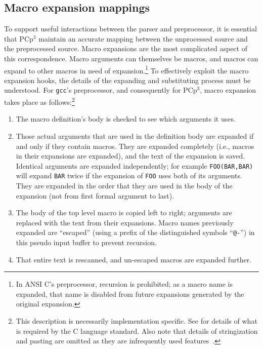 \documentclass{article}
\newcommand{\pcp}{\mbox{\textsf{PCp}$^3$}}
\newcommand{\C}{\mbox{\textsf{C}}}
\newcommand{\ie}{i.e.,}
\begin{document}
\subsection{Macro expansion mappings}
To support useful interactions between the parser and preprocessor, it
is essential that \pcp{} maintain an accurate mapping between the
unprocessed source and the preprocessed source.  Macro expansions are
the most complicated aspect of this correspondence.  Macro arguments can
themselves be macros, and macros can expand to other macros in need of
expansion.\footnote{In ANSI \C{}'s preprocessor, recursion is
  prohibited; as a macro name is expanded, that name is disabled from
  future expansions generated by the original expansion.}  To
effectively exploit the macro expansion hooks, the details of the
expanding and substituting process must be understood.  For
\texttt{gcc}'s preprocessor, and consequently for \pcp{}, macro
expansion takes place as follows:\footnote{This description is necessarily
  implementation specific.  See \cite[Ch.~3]{Harbison91} for details of
  what is required by the \C{} language standard.  Also note that
  details of stringization and pasting are omitted as they are
  infrequently used features~\cite{EmpCpp}.}

\begin{enumerate}
\item The macro definition's body is checked to see which arguments it uses.
\item Those actual arguments that are used in the definition body are
      expanded if and only if they contain macros.  They are expanded
      completely (\ie{} macros in their expansions are expanded), and
      the text of the expansion is saved.  Identical arguments are
      expanded independently; for example \texttt{FOO(BAR,BAR)} will
      expand \texttt{BAR} twice if the expansion of \texttt{FOO} uses
      both of its arguments.  They are expanded in the order that they
      are used in the body of the expansion (not from first formal
      argument to last).
\item The body of the top level macro is copied left to right; arguments
      are replaced with the text from their expansions.  Macro names
      previously expanded are ``escaped'' (using a prefix of the
      distinguished symbols ``\texttt{@-}'') in this pseudo input buffer
      to prevent recursion.
\item That entire text is rescanned, and un-escaped macros are expanded
      further.
\end{enumerate}
\end{document}
